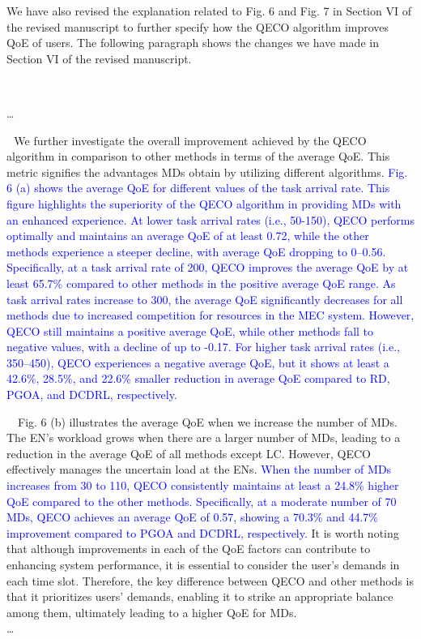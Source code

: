\documentclass[12pt,draftclsnofoot,onecolumn]{IEEEtran}
\newcommand{\rev}[1]{{\color{blue}#1}} %
\newcommand{\rev}[1]{#1}
\newenvironment{my}[2]%
{\begin{list}{}%
{\setlength{\rightmargin}{#1}\setlength{\leftmargin}{#2}}%


 \item[]{}

} {\end{list}}
\begin{document}
\begin{enumerate}
We have also revised the explanation related to Fig. 6 and Fig. 7 in Section VI of the revised manuscript to further specify how the QECO algorithm improves QoE of users. The following paragraph shows the changes we have made in Section VI of the revised manuscript.
		\begin{my}{1cm}{1cm}
	\rev{
		{\ 
			
			\dots \color{black}
			
			\,\,\,\,We further investigate the overall improvement achieved by the QECO algorithm in comparison to other methods in terms of the average QoE. This metric signifies the advantages MDs obtain by utilizing different algorithms. \textcolor{blue}{Fig. 6 (a) shows the average QoE for different values of the task arrival rate. This figure highlights the superiority of the QECO algorithm in providing MDs with an enhanced experience. At lower task arrival rates (i.e., 50-150), QECO performs optimally and maintains an average QoE of at least 0.72, while the other methods experience a steeper decline, with average QoE dropping to 0--0.56. Specifically, at a task arrival rate of 200, QECO improves the average QoE by at least 65.7\% compared to other methods in the positive average QoE range. As task arrival rates increase to 300, the average QoE significantly decreases for all methods due to increased competition for resources in the MEC system. However, QECO still maintains a positive average QoE, while other methods fall to negative values, with a decline of up to -0.17. For higher task arrival rates (i.e., 350–450), QECO experiences a negative average QoE, but it shows at least a 42.6\%, 28.5\%, and 22.6\% smaller reduction in average QoE compared to RD, PGOA, and DCDRL, respectively.} \vspace{3mm}
			
			
			
			\,\,\,\, Fig. 6 (b) illustrates the average QoE when we increase the number of MDs. The EN's workload grows when there are a larger number of MDs, leading to a reduction in the average QoE of all methods except LC. However, QECO effectively manages the uncertain load at the ENs. \textcolor{blue}{When the number of MDs increases from 30 to 110, QECO consistently maintains at least a 24.8\% higher QoE compared to the other methods. Specifically, at a moderate number of 70 MDs, QECO achieves an average QoE of 0.57, showing a 70.3\% and 44.7\% improvement compared to PGOA and DCDRL, respectively.} It is worth noting that although improvements in each of the QoE factors can contribute to enhancing system performance, it is essential to consider the user's demands in each time slot. Therefore, the key difference between QECO and other methods is that it prioritizes users' demands, enabling it to strike an appropriate balance among them, ultimately leading to a higher QoE for MDs.
			\vspace{3mm}\\\dots }}
	

\end{my}
\end{enumerate}
\end{document}
